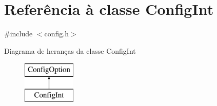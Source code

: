 \hypertarget{class_config_int}{\section{Referência à classe Config\-Int}
\label{class_config_int}
}


{\ttfamily \#include $<$config.\-h$>$}

Diagrama de heranças da classe Config\-Int\begin{figure}[H]
\begin{center}
\leavevmode
\includegraphics[height=2.000000cm]{class_config_int}
\end{center}
\end{figure}
